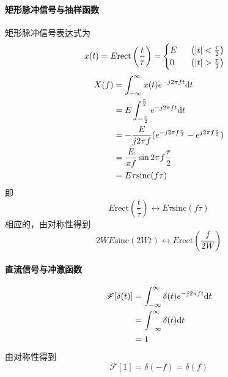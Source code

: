     \paragraph{矩形脉冲信号与抽样函数} 矩形脉冲信号表达式为
    \begin{equation}
        x(t)=E\text{rect}\left(\frac{t}{\tau}\right)=
        \begin{cases}
            E\phantom{0}\hspace{10pt}\left(\left\vert t \right\vert<\frac{\tau}{2}\right)\\
            0\phantom{E}\hspace{10pt}\left(\left\vert t \right\vert>\frac{\tau}{2}\right)\\  
        \end{cases}
    \end{equation}
    \begin{equation*}
        \begin{split}
            X(f)&=\int_{-\infty}^{\infty}x(t)e^{-j2\pi ft}\text{\upshape d} t\\
                &=E\int_{-\frac{\tau}{2}}^{\frac{\tau}{2}}e^{-j2\pi ft}\text{\upshape d} t\\
                &=-\frac{E}{j2\pi f}(e^{-j2\pi f\frac{\tau}{2}}-e^{j2\pi f\frac{\tau}{2}})\\
                &=\frac{E}{\pi f}\sin{2\pi f\frac{\tau}{2}}\\
                &=E\tau \text{sinc}(f\tau)
        \end{split}
    \end{equation*}
    即
    \begin{equation}
        E\text{rect}\left(\frac{t}{\tau}\right)\leftrightarrow E\tau \text{sinc}(f\tau)
    \end{equation}
    相应的，由对称性得到
    \begin{equation}
        2WE\text{sinc}(2Wt)\leftrightarrow E\text{rect}\left(\frac{f}{2W}\right)
    \end{equation}
    \paragraph{直流信号与冲激函数}
    \begin{equation}
        \begin{split}
        \mathscr{F}[\delta(t)] &=\int_{-\infty}^{\infty}\delta(t)e^{-j2\pi ft}\text{\upshape d} t\\
                               &=\int_{-\infty}^{\infty}\delta(t)\text{\upshape d} t\\
                               &=1
        \end{split}
    \end{equation}
    由对称性得到
    \begin{equation}
        \mathscr{F}[1]=\delta (-f)=\delta (f)
    \end{equation}


